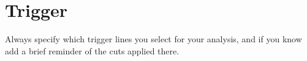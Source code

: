 \section{Trigger}
Always specify which trigger lines you 
select for your analysis, and if you know add a 
brief reminder of the cuts applied there.